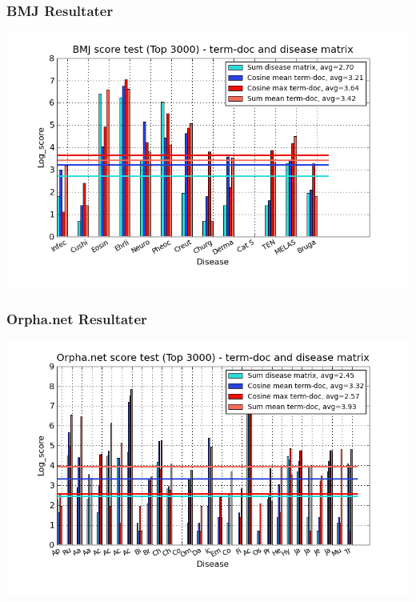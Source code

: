 \documentclass[xcolor=table]{beamer}
\begin{document}
\begin{frame}

  \frametitle{BMJ Resultater}

  \begin{center}
    \includegraphics[width=1.0\textwidth]{diagram/termDoc_bmj_hist_3000_sum_dm_mea_cos_sqrt_td_max_cos_sqrt_td_mea_sum_td}
  \end{center}

\end{frame}

\begin{frame}

  \frametitle{Orpha.net Resultater}

  \begin{center}
    \includegraphics[width=1.0\textwidth]{diagram/termDoc_orphan_hist_3000_sum_dm_mea_cos_sqrt_td_max_cos_sqrt_td_mea_sum_nn_td}
  \end{center}

\end{frame}
\end{document}
